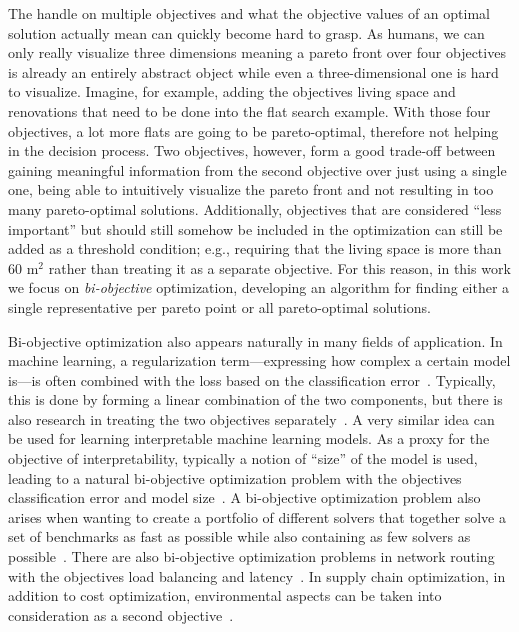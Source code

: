 
The handle on multiple objectives and what the objective values of an optimal solution actually mean can quickly become hard to grasp.
As humans, we can only really visualize three dimensions meaning a pareto front over four objectives is already an entirely abstract object while even a three-dimensional one is hard to visualize.
Imagine, for example, adding the objectives living space and renovations that need to be done into the flat search example.
With those four objectives, a lot more flats are going to be pareto-optimal, therefore not helping in the decision process.
Two objectives, however, form a good trade-off between gaining meaningful information from the second objective over just using a single one, being able to intuitively visualize the pareto front and not resulting in too many pareto-optimal solutions.
Additionally, objectives that are considered ``less important'' but should still somehow be included in the optimization can still be added as a threshold condition;
e.g., requiring that the living space is more than 60 $\text{m}^2$ rather than treating it as a separate objective.
For this reason, in this work we focus on \emph{bi-objective} optimization, developing an algorithm for finding either a single representative per pareto point or all pareto-optimal solutions.

Bi-objective optimization also appears naturally in many fields of application.
In machine learning, a regularization term---expressing how complex a certain model is---is often combined with the loss based on the classification error~\autocite{}.
Typically, this is done by forming a linear combination of the two components, but there is also research in treating the two objectives separately~\autocite{}.
A very similar idea can be used for learning interpretable machine learning models.
As a proxy for the objective of interpretability, typically a notion of ``size'' of the model is used, leading to a natural bi-objective optimization problem with the objectives classification error and model size~\autocite{}.
A bi-objective optimization problem also arises when wanting to create a portfolio of different solvers that together solve a set of benchmarks as fast as possible while also containing as few solvers as possible~\autocite{}.
There are also bi-objective optimization problems in network routing with the objectives load balancing and latency~\autocite{}.
In supply chain optimization, in addition to cost optimization, environmental aspects can be taken into consideration as a second objective~\autocite{}.


